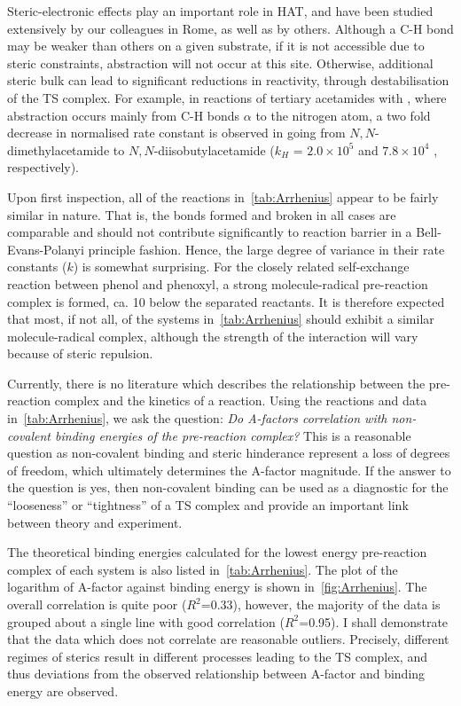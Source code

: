 Steric-electronic effects play an important role in HAT, and have been studied extensively by our colleagues in Rome, as well as by others.\cite{Finn2004,Salamone2011,Pischel2001,Griller1981,Bietti2011, Salamone2012,Malatesta1982,Salamone2014} Although a C-H bond may be weaker than others on a given substrate, if it is not accessible due to steric constraints, abstraction will not occur at this site. Otherwise, additional steric bulk can lead to significant reductions in reactivity, through destabilisation of the TS complex. For example, in reactions of tertiary acetamides with \cumo,\cite{Salamone2014} where abstraction occurs mainly from C-H bonds $\alpha$ to the nitrogen atom, a two fold decrease in normalised rate constant is observed in going from $N,N$-dimethylacetamide to $N,N$-diisobutylacetamide ($k_H$ = $2.0 \times 10^5$ and $7.8 \times 10^4$ \Ms, respectively).

Upon first inspection, all of the reactions in~\ref{tab:Arrhenius} appear to be fairly similar in nature. That is, the bonds formed and broken in all cases are comparable and should not contribute significantly to reaction barrier in a Bell-Evans-Polanyi principle fashion. Hence, the large degree of variance in their rate constants ($k$) is somewhat surprising. For the closely related self-exchange reaction between phenol and phenoxyl,\cite{Mayer2002} a strong molecule-radical pre-reaction complex is formed, ca. 10 \kcalmol below the separated reactants. It is therefore expected that most, if not all, of the systems in~\ref{tab:Arrhenius} should exhibit a similar molecule-radical complex, although the strength of the interaction will vary because of steric repulsion.

Currently, there is no literature which describes the relationship between the pre-reaction complex and the kinetics of a reaction. Using the reactions and data in~\ref{tab:Arrhenius}, we ask the question: \emph{Do A-factors correlation with non-covalent binding energies of the pre-reaction complex?} This is a reasonable question as non-covalent binding and steric hinderance represent a loss of degrees of freedom, which ultimately determines the A-factor magnitude. If the answer to the question is yes, then non-covalent binding can be used as a diagnostic for the ``looseness'' or ``tightness'' of a TS complex and provide an important link between theory and experiment.

The theoretical binding energies calculated for the lowest energy pre-reaction complex of each system is also listed in~\ref{tab:Arrhenius}. The plot of the logarithm of A-factor against binding energy is shown in~\ref{fig:Arrhenius}. The overall correlation is quite poor ($R^2$=0.33), however, the majority of the data is grouped about a single line with good correlation ($R^2$=0.95). I shall demonstrate that the data which does not correlate are reasonable outliers. Precisely, different regimes of sterics result in different processes leading to the TS complex, and thus deviations from the observed relationship between A-factor and binding energy are observed.

